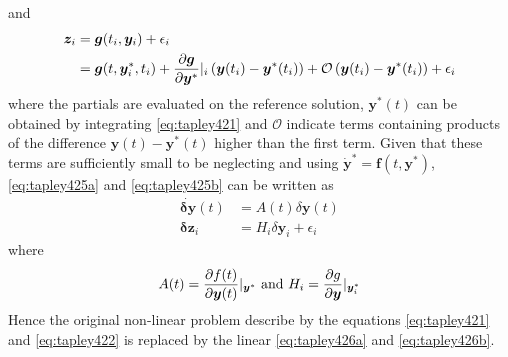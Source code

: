 and
\begin{equation}\label{eq:tapley425b}
  \begin{aligned}
  \bm{z}_i &= \bm{g}(t_i, \bm{y}_i) + \epsilon _i \\ 
           &= \bm{g}(t, \bm{y}^{*}_{i}, t_i) 
           + \frac{\partial \bm{g}}{\partial \bm{y}^{*}}|_{i} 
           \left( \bm{y}(t_i) - \bm{y}^{*}(t_i) \right) 
           + \mathcal{O}\left( \bm{y}(t_i) - \bm{y}^{*}(t_i) \right) 
           + \epsilon _i
  \end{aligned}
\end{equation}
where the partials are evaluated on the reference solution, $\bm{y}^{*}(t)$ can be 
obtained by integrating \autoref{eq:tapley421} and $\mathcal{O}$ indicate terms 
containing products of the difference $\bm{y}(t) - \bm{y}^{*}(t)$ higher than the 
first term. Given that these terms are sufficiently small to be neglecting and using 
$ \bm{\dot{y}}^{*} = \bm{f}(t, \bm{y}^{*})$, \autoref{eq:tapley425a} and 
\autoref{eq:tapley425b} can be written as
\begin{align}
  \dot{\bm{\delta y}}(t) &= A(t) \delta \bm{y}(t) \label{eq:tapley426a}\\
  \bm{\delta z}_i &= H_i \delta \bm{y}_i + \epsilon _i \label{eq:tapley426b}
\end{align}
where 
\begin{equation}\label{eq:tapley426c}
  A(t) = \frac{\partial f (t)}{\partial \bm{y}(t)}|_{\bm{y}^{*}} 
  \text{ and }
  H_i = \frac{\partial g}{\partial \bm{y}}|_{\bm{y}^{*}_i}
\end{equation}
Hence the original non-linear problem describe by the equations \autoref{eq:tapley421} 
and \autoref{eq:tapley422} is replaced by the linear \autoref{eq:tapley426a} and 
\autoref{eq:tapley426b}.
